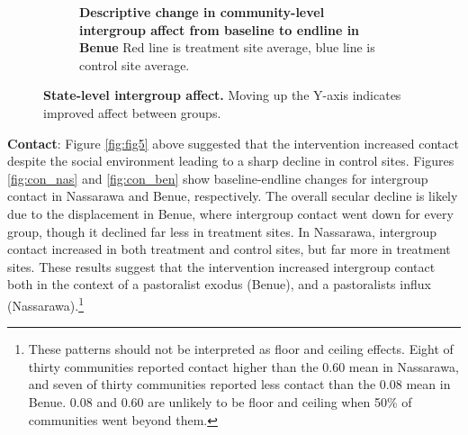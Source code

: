 \documentclass[11pt]{article}
\begin{document}
\begin{figure}[H]
\begin{subfigure}[b]{.48\textwidth}
        \caption{\textbf{Descriptive change in community-level intergroup affect from baseline to endline in Benue} Red line is treatment site average, blue line is control site average.}
        \label{fig:affect_ben}
    \end{subfigure}
    \caption{\textbf{State-level intergroup affect.}  Moving up the Y-axis indicates improved affect between groups.}
\end{figure}

\textbf{Contact}: Figure \ref{fig:fig5} above suggested that the
intervention increased contact despite the social environment leading to
a sharp decline in control sites. Figures \ref{fig:con_nas} and
\ref{fig:con_ben} show baseline-endline changes for intergroup contact
in Nassarawa and Benue, respectively. The overall secular decline is
likely due to the displacement in Benue, where intergroup contact went
down for every group, though it declined far less in treatment sites. In
Nassarawa, intergroup contact increased in both treatment and control
sites, but far more in treatment sites. These results suggest that the
intervention increased intergroup contact both in the context of a
pastoralist exodus (Benue), and a pastoralists influx
(Nassarawa).\footnote{These patterns should not be interpreted as floor
  and ceiling effects. Eight of thirty communities reported contact
  higher than the 0.60 mean in Nassarawa, and seven of thirty
  communities reported less contact than the 0.08 mean in Benue. 0.08
  and 0.60 are unlikely to be floor and ceiling when 50\% of communities
  went beyond them.}
\end{document}
